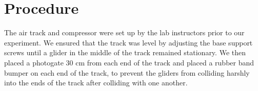 \section*{Procedure}

The air track and compressor were set up by the lab instructors prior to
our experiment. We ensured that the track was level by adjusting the base
support screws until a glider in the middle of the track remained stationary.
We then placed a photogate 30 cm from each end of the track and placed a 
rubber band bumper on each end of the track, to prevent the gliders from
colliding harshly into the ends of the track after colliding with one another.
